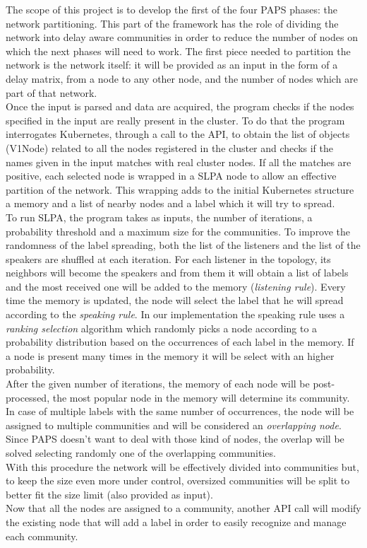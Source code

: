 The scope of this project is to develop the first of the four PAPS phases: the network 
partitioning. This part of the framework has the role of dividing the network into 
delay aware communities in order to reduce the number of nodes on which the next phases
will need to work. The first piece needed to partition the network is the network itself:
it will be provided as an input in the form of a delay matrix, from a node to any other
node, and the number of nodes which are part of that network. \\ 
Once the input is parsed and data are acquired, the program checks if the nodes specified 
in the input are really present in the cluster. To do that the program interrogates 
Kubernetes, through a call to the API, to obtain the list of objects (V1Node) related to
all the nodes registered in the cluster and checks if the names given in the
input matches with real cluster nodes. If all the matches are positive, each selected 
node is wrapped in a SLPA node to allow an effective partition of the network.
This wrapping adds to the initial Kubernetes structure a memory and a list of nearby 
nodes and a label which it will try to spread.\\
To run SLPA, the program takes as inputs, the number of iterations, a probability threshold 
and a maximum size for the communities. To improve the randomness of the label spreading, 
both the list of the listeners and the list of the speakers are shuffled at each iteration.
For each listener in the topology, its neighbors will become the speakers and from them it
will obtain a list of labels and the most received one will be added to the memory 
(\textit{listening rule}). Every time the memory is updated, the node will select the 
label that he will spread according to the \textit{speaking rule}. In our implementation
the speaking rule uses a \textit{ranking selection} algorithm which randomly picks a node
according to a probability distribution based on the occurrences of each label
in the memory. If a node is present many times in the memory it will be select with an 
higher probability. \\
After the given number of iterations, the memory of each node will be post-processed, 
the most popular node in the memory will determine its community. In case of multiple
labels with the same number of occurrences, the node will be assigned to multiple 
communities and will be considered an \textit{overlapping node}. Since PAPS doesn't 
want to deal with those kind of nodes, the overlap will be solved selecting randomly 
one of the overlapping communities. \\
With this procedure the network will be effectively divided into communities but, 
to keep the size even more under control, oversized communities will be split to better
fit the size limit (also provided as input). \\
Now that all the nodes are assigned to a community, another API call will modify the
existing node that will add a label in order to easily recognize and manage each community.

